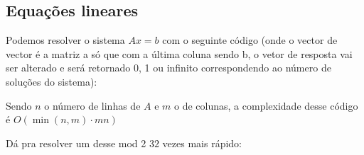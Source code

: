 \subsection{Equações lineares}

Podemos resolver o sistema $Ax = b$ com o seguinte código (onde o vector de vector é a matriz a só que com a última coluna sendo b, o vetor de resposta vai ser alterado e será retornado 0, 1 ou infinito correspondendo ao número de soluções do sistema):


Sendo $n$ o número de linhas de $A$ e $m$ o de colunas, a complexidade desse código é $O(\min(n, m) \cdot mn)$

Dá pra resolver um desse mod 2 $32$ vezes mais rápido:



